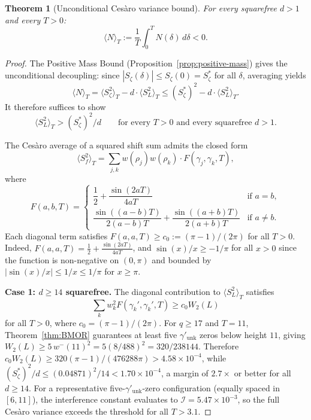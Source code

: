 \documentclass[12pt,reqno]{amsart}
\theoremstyle{plain}
\newtheorem{theorem}{Theorem}[section]
\theoremstyle{definition}
\theoremstyle{remark}
\begin{document}
\begin{theorem}[Unconditional Ces\`aro variance bound]\label{thm:cesaro}
For every squarefree $d > 1$ and every $T > 0$:
\[
\langle N \rangle_T := \frac{1}{T} \int_0^T N(\delta) \, d\delta < 0.
\]
\end{theorem}

\begin{proof}
The Positive Mass Bound (Proposition~\ref{prop:positive-mass}) gives the unconditional decoupling: since $|S_\zeta(\delta)| \leq S_\zeta(0) = S_\zeta^*$ for all $\delta$, averaging yields
\[
  \langle N \rangle_T = \langle S_\zeta^2 \rangle_T - d \cdot \langle S_L^2 \rangle_T \leq (S_\zeta^*)^2 - d \cdot \langle S_L^2 \rangle_T.
\]
It therefore suffices to show
\begin{equation}\label{eq:cesaro-threshold}
  \langle S_L^2 \rangle_T > (S_\zeta^*)^2 / d \qquad\text{for every } T > 0 \text{ and every squarefree } d > 1.
\end{equation}

The Ces\`aro average of a squared shift sum admits the closed form
\[
  \langle S_f^2 \rangle_T = \sum_{j,k} w(\rho_j) w(\rho_k) \cdot F(\gamma_j, \gamma_k, T),
\]
where
\[
  F(a,b,T) = \begin{cases} \dfrac{1}{2} + \dfrac{\sin(2aT)}{4aT} & \text{if } a = b, \\[6pt] \dfrac{\sin((a-b)T)}{2(a-b)T} + \dfrac{\sin((a+b)T)}{2(a+b)T} & \text{if } a \neq b. \end{cases}
\]
Each diagonal term satisfies $F(a,a,T) \geq c_0 := (\pi-1)/(2\pi)$ for all $T > 0$.  Indeed, $F(a,a,T) = \frac{1}{2} + \frac{\sin(2aT)}{4aT}$, and $\sin(x)/x \geq -1/\pi$ for all $x > 0$ since the function is non-negative on $(0,\pi)$ and bounded by $|\sin(x)/x| \leq 1/x \leq 1/\pi$ for $x \geq \pi$.

\medskip\noindent\textbf{Case 1: $d \geq 14$ squarefree.}
The diagonal contribution to $\langle S_L^2\rangle_T$ satisfies
\[
  \sum_k w_k^2 F(\gamma_k', \gamma_k', T) \geq c_0 W_2(L)
\]
for all $T > 0$, where $c_0 = (\pi-1)/(2\pi)$.  For $q \geq 17$ and $T = 11$, Theorem~\ref{thm:BMOR} guarantees at least five $\gamma'_{\mathrm{unk}}$ zeros below height $11$, giving $W_2(L) \geq 5\,w^-(11)^2 = 5(8/488)^2 = 320/238144$.  Therefore $c_0 W_2(L) \geq 320(\pi-1)/(476288\pi) > 4.58 \times 10^{-4}$, while $(S_\zeta^*)^2/d \leq (0.04871)^2/14 < 1.70 \times 10^{-4}$, a margin of $2.7\times$ or better for all $d \geq 14$.  For a representative five-$\gamma'_{\mathrm{unk}}$-zero configuration (equally spaced in $[6,11]$), the interference constant evaluates to $\mathcal{I} = 5.47 \times 10^{-3}$, so the full Ces\`aro variance exceeds the threshold for all $T > 3.1$.


\end{proof}
\end{document}

